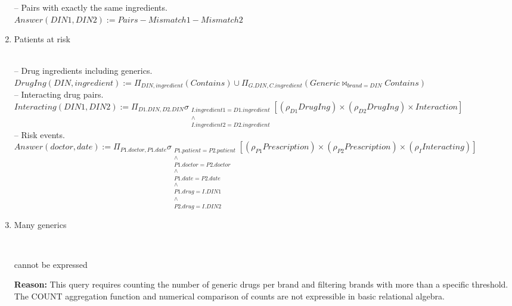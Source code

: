 \documentclass{article}
\newcommand{\var}[1]{\mathit{#1}}
\begin{document}
\begin{enumerate}
{-- Pairs with exactly the same ingredients. \\[5pt]
$
Answer(\var{DIN1}, \var{DIN2}) :=
  Pairs - Mismatch1 - Mismatch2
$
}

\item {\large Patients at risk}

{~}\\
{\large
-- Drug ingredients including generics. \\[5pt]
$
DrugIng(\var{DIN}, \var{ingredient}) :=
  \Pi_{\var{DIN}, \var{ingredient}}(\var{Contains})
  \cup
  \Pi_{G.\var{DIN}, C.\var{ingredient}}
  (\var{Generic} \bowtie_{\var{brand} = \var{DIN}} \var{Contains})
$ \\[10pt]

-- Interacting drug pairs. \\[5pt]
$
Interacting(\var{DIN1}, \var{DIN2}) :=
  \Pi_{D1.\var{DIN}, D2.\var{DIN}}
  \sigma_{\substack{
    I.\var{ingredient1} = D1.\var{ingredient} \\
    \wedge \\
    I.\var{ingredient2} = D2.\var{ingredient}
  }}
  [ (\rho_{D1}DrugIng) \times (\rho_{D2}DrugIng) \times \var{Interaction} ]
$ \\[10pt]

-- Risk events. \\[5pt]
$
Answer(\var{doctor}, \var{date}) :=
  \Pi_{P1.\var{doctor}, P1.\var{date}}
  \sigma_{\substack{
    P1.\var{patient} = P2.\var{patient} \\
    \wedge \\
    P1.\var{doctor} = P2.\var{doctor} \\
    \wedge \\
    P1.\var{date} = P2.\var{date} \\
    \wedge \\
    P1.\var{drug} = I.\var{DIN1} \\
    \wedge \\
    P2.\var{drug} = I.\var{DIN2}
  }}
  [ (\rho_{P1}\var{Prescription})
    \times
    (\rho_{P2}\var{Prescription})
    \times
    (\rho_I Interacting) ]
$
}

\item {\large Many generics}

{~}\\
{\large
cannot be expressed

\textbf{Reason:} This query requires counting the number of generic drugs per brand and filtering brands with more than a specific threshold. The COUNT aggregation function and numerical comparison of counts are not expressible in basic relational algebra.
}


\end{enumerate}
\end{document}
